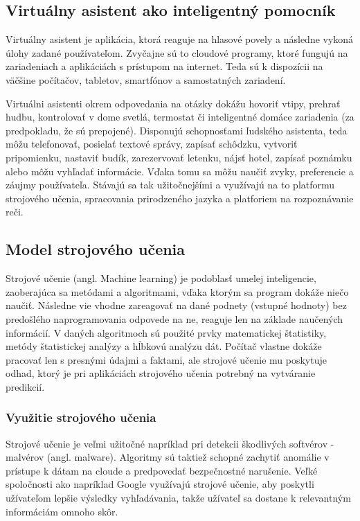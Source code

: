 \documentclass[10pt,twoside,slovak,coursepaper]{article}
\begin{document}
\subsection{Virtuálny asistent ako inteligentný pomocník}
Virtuálny asistent je aplikácia, ktorá reaguje na hlasové povely a následne vykoná úlohy zadané používateľom. Zvyčajne sú to cloudové programy, ktoré fungujú na zariadeniach a aplikáciách s prístupom na internet. Teda sú k dispozícii na väčšine počítačov, tabletov, smartfónov a samostatných zariadení.

Virtuálni asistenti okrem odpovedania na otázky dokážu hovoriť vtipy, prehrať hudbu, kontrolovať v dome svetlá, termostat či inteligentné domáce zariadenia (za predpokladu, že sú prepojené). Disponujú schopnosťami ľudského asistenta, teda môžu telefonovať, posielať textové správy, zapísať schôdzku, vytvoriť pripomienku, nastaviť budík, zarezervovať letenku, nájsť hotel, zapísať poznámku alebo môžu vyhľadať informácie.
Vďaka tomu sa môžu naučiť zvyky, preferencie a záujmy používateľa. Stávajú sa tak užitočnejšími a využívajú na to platformu strojového učenia, spracovania prirodzeného jazyka a platforiem na rozpoznávanie reči.

\subsection{Model strojového učenia}
Strojové učenie (angl. Machine learning) je podoblasť umelej inteligencie, zaoberajúca sa metódami a algoritmami, vďaka ktorým sa program dokáže niečo naučiť. Následne vie vhodne zareagovať na dané podnety (vstupné hodnoty) bez predošlého naprogramovania odpovede na ne, reaguje len na základe naučených informácií. V daných algoritmoch sú použité prvky matematickej štatistiky, metódy štatistickej analýzy a hĺbkovú analýzu dát.
Počítač vlastne dokáže pracovať len s presnými údajmi a faktami, ale strojové učenie mu poskytuje odhad, ktorý je pri aplikáciách strojového učenia potrebný na vytváranie predikcií.

\subsubsection{Využitie strojového učenia}
Strojové  učenie je veľmi užitočné napríklad pri detekcii škodlivých softvérov - malvérov (angl. malware). Algoritmy sú taktiež schopné zachytiť anomálie v prístupe k dátam na cloude a predpovedať bezpečnostné narušenie. Veľké spoločnosti ako napríklad Google využívajú strojové učenie, aby poskytli užívateľom lepšie výsledky vyhľadávania, takže užívateľ sa dostane k relevantným informáciám omnoho skôr.
\end{document}
